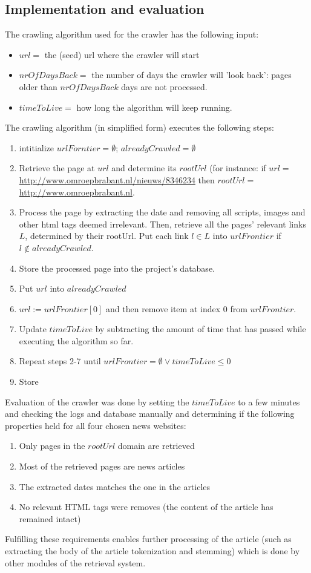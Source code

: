 \subsection*{Implementation and evaluation}
The crawling algorithm used for the crawler has the following input:
\begin{itemize}[noitemsep]
\item $url = $ the (seed) url where the crawler will start
\item $nrOfDaysBack = $ the number of days the crawler will 'look back': pages older than $nrOfDaysBack$ days are not processed.
\item $timeToLive = $ how long the algorithm will keep running.
\end{itemize}
The crawling algorithm (in simplified form) executes the following steps:
\begin{enumerate}
\item intitialize $urlForntier = \emptyset$; $alreadyCrawled = \emptyset$
\item Retrieve the page at $url$ and determine its $rootUrl$ (for instance: if $url = $\url{http://www.omroepbrabant.nl/nieuws/8346234} then $rootUrl = $\url{http://www.omroepbrabant.nl}.
\item Process the page by extracting the date and removing all scripts, images and other html tags deemed irrelevant. Then, retrieve all the pages' relevant links $L$, determined by their rootUrl. Put each link $l \in L$ into $urlFrontier$ if $l \not\in alreadyCrawled$. 
\item Store the processed page into the project's database.
\item Put $url$ into $alreadyCrawled$
\item $url := urlFrontier[0]$ and then remove item at index 0 from $urlFrontier$.
\item Update $timeToLive$ by subtracting the amount of time that has passed while executing the algorithm so far.
\item Repeat steps 2-7 until $urlFrontier = \emptyset \vee timeToLive \le 0$
\item Store 
\end{enumerate}
Evaluation of the crawler was done by setting the $timeToLive$ to a few minutes and checking the logs and database manually and determining if the following properties held for all four chosen news websites:
\begin{enumerate}
\item Only pages in the $rootUrl$ domain are retrieved
\item Most of the retrieved pages are news articles
\item The extracted dates matches the one in the articles
\item No relevant HTML tags were removes (the content of the article has remained intact)
\end{enumerate}
Fulfilling these requirements enables further processing of the article (such as extracting the body of the article tokenization and stemming) which is done by other modules of the retrieval system.\\
